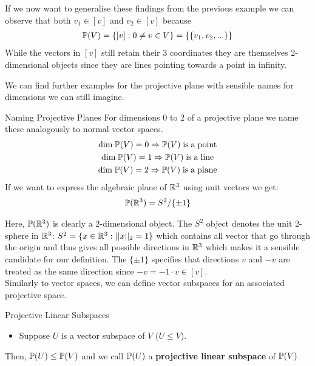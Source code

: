 If we now want to generalise these findings from the previous example we can observe that both $v_1 \in [v]$ and $v_2 \in [v]$ because
    \begin{gather*}
        \mathbb{P}(V) = \{ [v] :  0 \neq v\in V\} = \{ \{v_1, v_2, ...\}\} 
    \end{gather*}
While the vectors in $[v]$ still retain their 3 coordinates they are themselves 2-dimensional objects since they are lines pointing towards a point in infinity.




We can find further examples for the projective plane with sensible names for dimensions we can still imagine.
\begin{exampleBox}{Naming Projective Planes}
    For dimensions 0 to 2 of a projective plane we name these analogously to normal vector spaces.
    \begin{gather*}
        \mathrm{dim} \; \mathbb{P}(V) = 0 \Rightarrow \mathbb{P}(V) \mathrm{\;is \;a\; point} \\
        \mathrm{dim} \; \mathbb{P}(V) = 1 \Rightarrow \mathbb{P}(V) \mathrm{\;is \;a\; line} \\
        \mathrm{dim} \; \mathbb{P}(V) = 2 \Rightarrow \mathbb{P}(V) \mathrm{\;is \;a\; plane} \\
    \end{gather*}
    If we want to express the algebraic plane of $\mathbb{R}^3$ using unit vectors we get:
    \begin{gather*}
        \mathbb{P}(\mathbb{R}^3) = S^2/\{\pm 1\}
    \end{gather*}
\end{exampleBox}

Here, $\mathbb{P}(\mathbb{R}^3)$ is clearly a 2-dimensional object. The $S^2$ object denotes the unit 2-sphere in $\mathbb{R}^3$: $S^2 = \{x \in \mathbb{R}^3: ||x||_2 = 1\}$ which contains all vector that go through the origin and thus gives all possible directions in $\mathbb{R}^3$ which makes it a sensible candidate for our definition. The $\{\pm 1\}$ specifies that directions $v$ and $-v$ are treated as the same direction since $-v = -1 \cdot v\in [v]$.\\

Similarly to vector spaces, we can define vector subspaces for an associated projective space.
\begin{definitionBox}{Projective Linear Subspaces}
    \begin{itemize}
        \item Suppose $U$ is a vector subspace of $V$ ($U \leq V$).
    \end{itemize}
    Then, $\mathbb{P}(U) \leq \mathbb{P}(V)$ and we call $\mathbb{P}(U)$ a \textbf{projective linear subspace} of $\mathbb{P}(V)$
\end{definitionBox}

